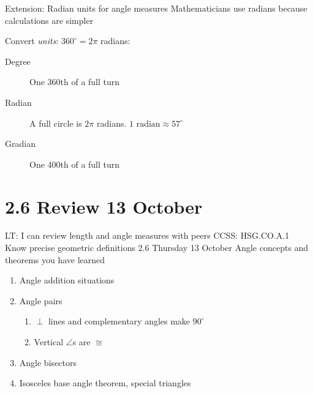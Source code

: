 \begin{frame}{Extension: Radian units for angle measures}
  {Mathematicians use radians because calculations are simpler}
    \begin{center}
    \end{center}
  Convert \emph{units}: $360^\circ = 2 \pi$ radians:
    \begin{description}
      \item[Degree] One 360th of a full turn
      \item[Radian] A full circle is $2\pi$ radians. $1 \text{ radian} \approx 57^\circ$
      \item[Gradian] One 400th of a full turn
    \end{description}
  \end{frame}
  
\section{2.6 Review \hfill 13 October}
\begin{frame}{LT: I can review length and angle measures with peers}
  {CCSS: HSG.CO.A.1 Know precise geometric definitions  \hfill \alert{2.6 Thursday 13 October}}
  Angle concepts and theorems you have learned
  \begin{enumerate}
    \item Angle addition situations
    \item Angle pairs
    \begin{enumerate}
      \item $\perp$ lines and complementary angles make $90^\circ$
      \item Vertical $\angle$s are $\cong$
    \end{enumerate}
    \item Angle bisectors
    \item Isosceles base angle theorem, special triangles
  \end{enumerate}
\end{frame}

